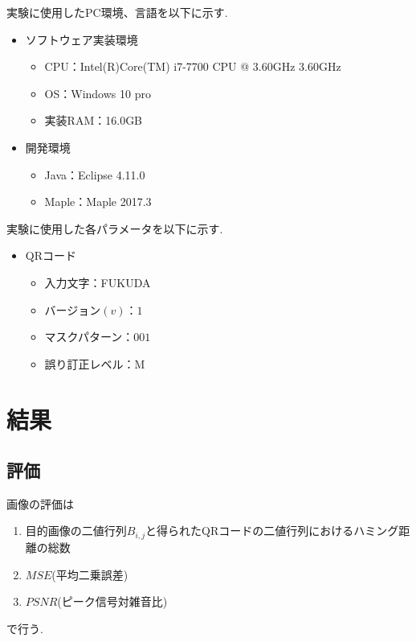 \documentclass{thesis}
\begin{document}
実験に使用したPC環境、言語を以下に示す.

\begin{itemize}
\setlength{\itemsep}{5mm}
 \item ソフトウェア実装環境
    \begin{itemize}
      \item CPU：Intel(R)Core(TM) i7-7700 CPU @ 3.60GHz 3.60GHz
      \item OS：Windows 10 pro
      \item 実装RAM：16.0GB
     \end{itemize}
   \item 開発環境
    \begin{itemize}
      \item Java：Eclipse 4.11.0
      \item Maple：Maple 2017.3
   \end{itemize}
\end{itemize}

実験に使用した各パラメータを以下に示す.

\begin{itemize}
\setlength{\itemsep}{5mm}
 \item QRコード
    \begin{itemize}
      \item 入力文字：FUKUDA
      \item バージョン$(v)$：$1$
      \item マスクパターン：$001$
      \item 誤り訂正レベル：M
     \end{itemize}
  \end{itemize}


\chapter{結果}


\section{評価}

画像の評価は
\begin{enumerate}
\item
目的画像の二値行列$B_{i,j}$と得られたQRコードの二値行列におけるハミング距離の総数
\item
$MSE$(平均二乗誤差)
\item
$PSNR$(ピーク信号対雑音比)
\end{enumerate}
で行う.
\end{document}
